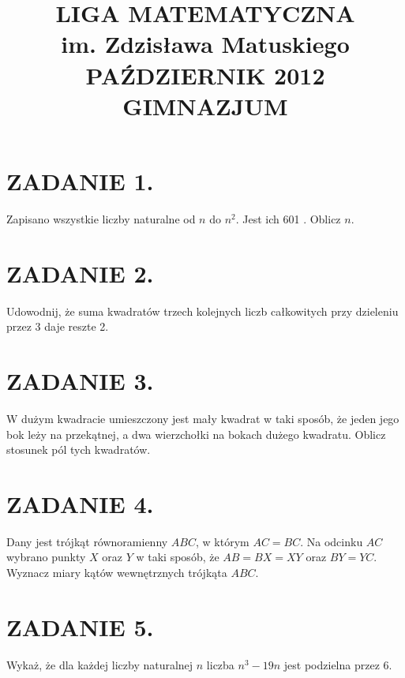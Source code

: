 \documentclass[10pt]{article}
\title{LIGA MATEMATYCZNA \\
 im. Zdzisława Matuskiego \\
 PAŹDZIERNIK 2012 \\
 GIMNAZJUM }
\author{}
\date{}
\begin{document}
\maketitle
\section*{ZADANIE 1.}
Zapisano wszystkie liczby naturalne od \(n\) do \(n^{2}\). Jest ich 601 . Oblicz \(n\).

\section*{ZADANIE 2.}
Udowodnij, że suma kwadratów trzech kolejnych liczb całkowitych przy dzieleniu przez 3 daje reszte 2.

\section*{ZADANIE 3.}
W dużym kwadracie umieszczony jest mały kwadrat w taki sposób, że jeden jego bok leży na przekątnej, a dwa wierzchołki na bokach dużego kwadratu. Oblicz stosunek pól tych kwadratów.

\section*{ZADANIE 4.}
Dany jest trójkąt równoramienny \(A B C\), w którym \(A C=B C\). Na odcinku \(A C\) wybrano punkty \(X\) oraz \(Y\) w taki sposób, że \(A B=B X=X Y\) oraz \(B Y=Y C\). Wyznacz miary kątów wewnętrznych trójkąta \(A B C\).

\section*{ZADANIE 5.}
Wykaż, że dla każdej liczby naturalnej \(n\) liczba \(n^{3}-19 n\) jest podzielna przez 6.
\end{document}
